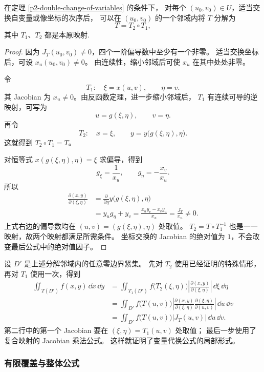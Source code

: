 \begin{lemma}[局部分解]\label{p2-local-triangular-factorization}
在定理 \ref{p2-double-change-of-variables} 的条件下，
对每个 $(u_0,v_0)\in U$，适当交换自变量或像坐标的次序后，
可以在 $(u_0,v_0)$ 的一个邻域内将 $T$ 分解为
\[
T=T_2\circ T_1,
\]
其中 $T_1$、$T_2$ 都是本原映射.
\end{lemma}
\begin{proof}
因为 $J_T(u_0,v_0)\ne0$，四个一阶偏导数中至少有一个非零。
适当交换坐标后，可设 $x_u(u_0,v_0)\ne0$。
由连续性，缩小邻域后可使 $x_u$ 在其中处处非零。

令
\[
T_1:\quad \xi=x(u,v),\qquad \eta=v.
\]
其 Jacobian 为 $x_u\ne0$。由反函数定理，进一步缩小邻域后，
$T_1$ 有连续可导的逆映射，可写为
\[
u=g(\xi,\eta),\qquad v=\eta.
\]
再令
\[
T_2:\quad x=\xi,\qquad y=y\bigl(g(\xi,\eta),\eta\bigr).
\]
这就得到 $T_2\circ T_1=T$。

对恒等式 $x(g(\xi,\eta),\eta)=\xi$ 求偏导，得到
\[
g_\xi=\frac1{x_u},\qquad g_\eta=-\frac{x_v}{x_u}.
\]
所以
\begin{align*}
\frac{\partial(x,y)}{\partial(\xi,\eta)}
&=\frac{\partial}{\partial\eta}
 y\bigl(g(\xi,\eta),\eta\bigr)\\
&=y_ug_\eta+y_v
 =\frac{x_uy_v-x_vy_u}{x_u}
 =\frac{J_T}{x_u}\ne0.
\end{align*}
上式右边的偏导数均在 $(u,v)=(g(\xi,\eta),\eta)$ 处取值。
$T_2=T\circ T_1^{-1}$ 也是一一映射，故两个映射都满足所需条件。
坐标交换的 Jacobian 的绝对值为 $1$，不会改变最后公式中的绝对值因子。
\end{proof}

设 $D'$ 是上述分解邻域内的任意零边界紧集。
先对 $T_2$ 使用已经证明的特殊情形，再对 $T_1$ 使用一次，得到
\begin{align*}
\iint_{T(D')}f(x,y)\,\dd x\,\dd y
&=\iint_{T_1(D')}
 f\bigl(T_2(\xi,\eta)\bigr)
 \left|\frac{\partial(x,y)}{\partial(\xi,\eta)}\right|
 \,\dd\xi\,\dd\eta\\
&=\iint_{D'} f\bigl(T(u,v)\bigr)
 \left|\frac{\partial(x,y)}{\partial(\xi,\eta)}
       \frac{\partial(\xi,\eta)}{\partial(u,v)}\right|
 \,\dd u\,\dd v\\
&=\iint_{D'}f\bigl(T(u,v)\bigr)|J_T(u,v)|\,\dd u\,\dd v.
\end{align*}
第二行中的第一个 Jacobian 要在 $(\xi,\eta)=T_1(u,v)$ 处取值；
最后一步使用了复合映射的 Jacobian 乘法公式。
这样就证明了变量代换公式的局部形式。

\subsubsection*{有限覆盖与整体公式}

